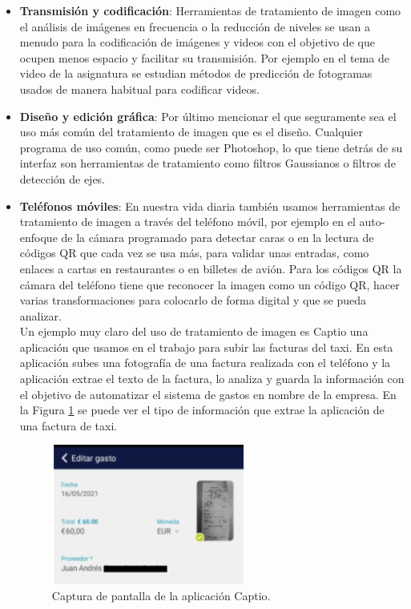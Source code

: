 \begin{itemize}
\item \textbf{Transmisión y codificación}: Herramientas de tratamiento de imagen como el análisis de imágenes en frecuencia o  la reducción de niveles se usan a menudo para la codificación de imágenes y videos con el objetivo de que ocupen menos espacio y facilitar su transmisión. Por ejemplo en el tema de video de la asignatura se estudian métodos de predicción de fotogramas usados de manera habitual para codificar videos.\\

\item \textbf{Diseño y edición gráfica}: Por último mencionar el que seguramente sea el uso más común del tratamiento de imagen que es el diseño. Cualquier programa de uso común, como puede ser Photoshop, lo que tiene detrás de su interfaz son herramientas de tratamiento como filtros Gaussianos o filtros de detección de ejes.\\

\item \textbf{Teléfonos móviles}: En nuestra vida diaria también usamos herramientas de tratamiento de imagen a través del teléfono móvil, por ejemplo en el auto-enfoque de la cámara programado para detectar caras o en la lectura de códigos QR que cada vez se usa más, para validar unas entradas, como enlaces a cartas en restaurantes o en billetes de avión. Para los códigos QR la cámara del teléfono tiene que reconocer la imagen como un código QR, hacer varias transformaciones para colocarlo de forma digital y que se pueda analizar.\\

Un ejemplo muy claro del uso de tratamiento de imagen es Captio una aplicación que usamos en el trabajo para subir las facturas del taxi. En esta aplicación subes una fotografía de una factura realizada con el teléfono y la aplicación extrae el texto de la factura, lo analiza y guarda la información con el objetivo de automatizar el sistema de gastos en nombre de la empresa. En la Figura \ref{taxi} se puede ver el tipo de información que extrae la aplicación de una factura de taxi.\\

\begin{figure}[h]
\centering
\includegraphics[width=0.6\textwidth]{imagenes/taxi.PNG}
\caption{Captura de pantalla de la aplicación Captio.}
\label{taxi}
\end{figure}


\end{itemize}
